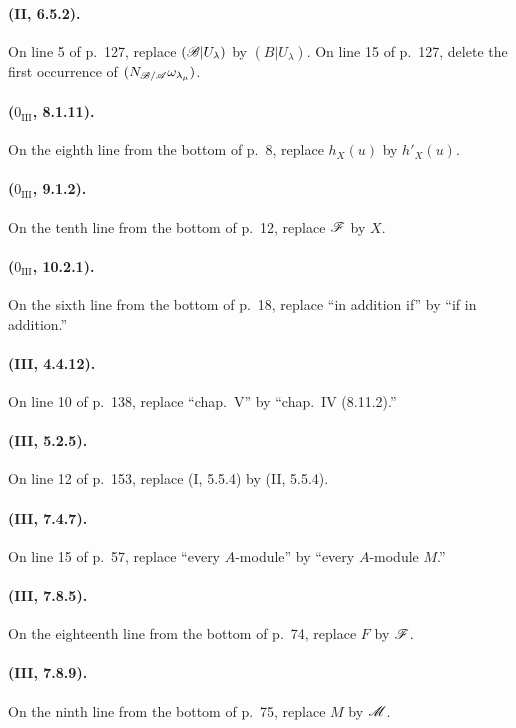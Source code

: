 \paragraph{(II, 6.5.2).}
On line 5 of p.~127, replace $(\mathscr{B}|U_\lambda)$ by $(B|U_\lambda)$.
On line 15 of p.~127, delete the first occurrence of
$(N_{\mathscr{B}/\mathscr{A}}\omega_{\lambda_\mu})$.

\paragraph{($0_{\mathrm{III}}$, 8.1.11).}
On the eighth line from the bottom of p.~8, replace $h_X(u)$ by
$h'_X(u)$.

\paragraph{($0_{\mathrm{III}}$, 9.1.2).}
On the tenth line from the bottom of p.~12, replace $\mathscr{F}$ by $X$.

\paragraph{($0_{\mathrm{III}}$, 10.2.1).}
On the sixth line from the bottom of p.~18, replace ``in addition if''
by ``if in addition.''

\paragraph{(III, 4.4.12).}
On line 10 of p.~138, replace ``chap.~V'' by ``chap.~IV (8.11.2).''

\paragraph{(III, 5.2.5).}
On line 12 of p.~153, replace (I, 5.5.4) by (II, 5.5.4).

\paragraph{(III, 7.4.7).}
On line 15 of p.~57, replace ``every $A$-module'' by
``every $A$-module $M$.''

\paragraph{(III, 7.8.5).}
On the eighteenth line from the bottom of p.~74, replace $F$ by $\mathscr{F}$.

\paragraph{(III, 7.8.9).}
On the ninth line from the bottom of p.~75, replace $M$ by $\mathscr{M}$.

